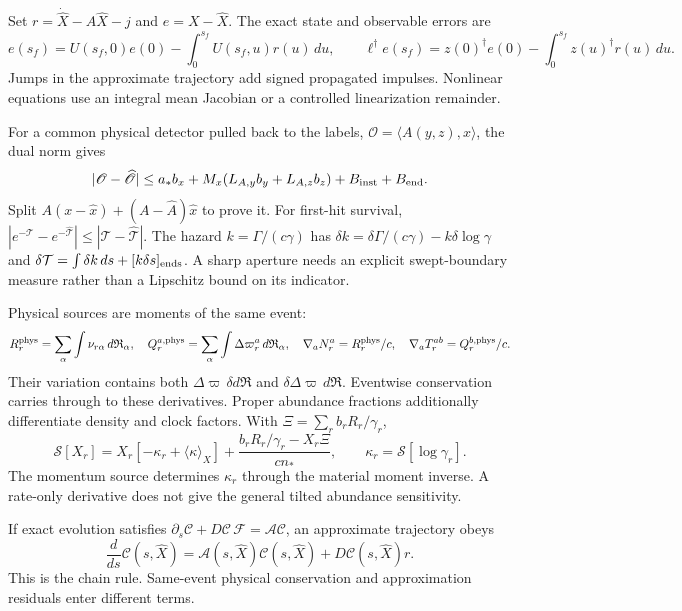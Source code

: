 Set $r=\dot{\widehat X}-A\widehat X-j$ and $e=X-\widehat X$. The exact state and observable errors are
\begin{equation}
 e(s_f)=U(s_f,0)e(0)-\int_0^{s_f}U(s_f,u)r(u)\,du,\qquad
 \ell^\dagger e(s_f)=z(0)^\dagger e(0)-\int_0^{s_f}z(u)^\dagger r(u)\,du .
 \label{v:adjoint_residual}
\end{equation}
Jumps in the approximate trajectory add signed propagated impulses. Nonlinear equations use an integral mean Jacobian or a controlled linearization remainder.

For a common physical detector pulled back to the labels, $\mathscr O=\langle A(y,z),x\rangle$, the dual norm gives
\begin{equation}
 |\mathscr O-\widehat{\mathscr O}|
 \le a_*b_x+M_x(L_{A,y}b_y+L_{A,z}b_z)+B_{\rm inst}+B_{\rm end}.
 \label{v:detector_bound}
\end{equation}
Split $A(x-\widehat x)+(A-\widehat A)\widehat x$ to prove it.
For first-hit survival, $|e^{-\mathcal T}-e^{-\widehat{\mathcal T}}|\le|\mathcal T-\widehat{\mathcal T}|$. The hazard $k=\Gamma/(c\gamma)$ has
$\delta k=\delta\Gamma/(c\gamma)-k\delta\log\gamma$ and
$\delta\mathcal T=\int\delta k\,ds+[k\delta s]_{\rm ends}$.
A sharp aperture needs an explicit swept-boundary measure rather than a Lipschitz bound on its indicator.

Physical sources are moments of the same event:
\begin{equation}
 R_r^{\rm phys}=\sum_\alpha\int\nu_{r\alpha}\,d\mathfrak R_\alpha,\quad
 Q_r^{a,\rm phys}=\sum_\alpha\int\Delta\varpi_r^a\,d\mathfrak R_\alpha,\quad
 \nabla_aN_r^a=R_r^{\rm phys}/c,\quad
 \nabla_aT_r^{ab}=Q_r^{b,\rm phys}/c .
 \label{v:event_sources}
\end{equation}
Their variation contains both $\Delta\varpi\,\delta d\mathfrak R$ and $\delta\Delta\varpi\,d\mathfrak R$. Eventwise conservation carries through to these derivatives. Proper abundance fractions additionally differentiate density and clock factors. With $\Xi=\sum_rb_rR_r/\gamma_r$,
\begin{equation}
 \mathcal S[X_r]=X_r[-\kappa_r+\langle\kappa\rangle_X]
 +\frac{b_rR_r/\gamma_r-X_r\Xi}{cn_*},\qquad
 \kappa_r=\mathcal S[\log\gamma_r].
 \label{v:abundance_clock}
\end{equation}
The momentum source determines $\kappa_r$ through the material moment inverse. A rate-only derivative does not give the general tilted abundance sensitivity.

If exact evolution satisfies
$\partial_s\mathcal C+D\mathcal C\,\mathcal F=\mathcal A\mathcal C$,
an approximate trajectory obeys
\begin{equation}
 \frac{d}{ds}\mathcal C(s,\widehat X)
 =\mathcal A(s,\widehat X)\mathcal C(s,\widehat X)
 +D\mathcal C(s,\widehat X)r .
 \label{v:constraint_residual}
\end{equation}
This is the chain rule. Same-event physical conservation and approximation residuals enter different terms.

